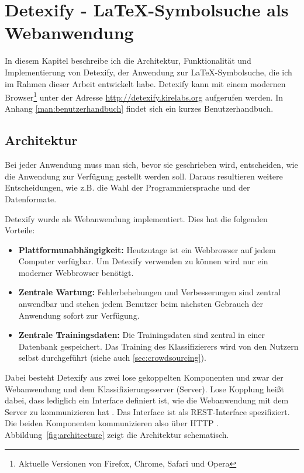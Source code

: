 \chapter[Detexify]{Detexify - \LaTeX-Symbolsuche als Webanwendung} %
\label{cha:detexify}

In diesem Kapitel beschreibe ich die Architektur, Funktionalität und Implementierung von Detexify, der Anwendung zur \LaTeX-Symbolsuche, die ich im Rahmen dieser Arbeit entwickelt habe. Detexify kann mit einem modernen Browser\footnote{Aktuelle Versionen von Firefox, Chrome, Safari und Opera} unter der Adresse \url{http://detexify.kirelabs.org} aufgerufen werden. In Anhang \ref{man:benutzerhandbuch} findet sich ein kurzes Benutzerhandbuch. 

\section{Architektur} %
\label{sec:architektur}

Bei jeder Anwendung muss man sich, bevor sie geschrieben wird, entscheiden, wie die Anwendung zur Verfügung gestellt werden soll. Daraus resultieren weitere Entscheidungen, wie z.B. die Wahl der Programmiersprache und der Datenformate.

Detexify wurde als Webanwendung implementiert. Dies hat die folgenden Vorteile:

\begin{itemize}
  \item \textbf{Plattformunabhängigkeit:} Heutzutage ist ein Webbrowser auf jedem Computer verfügbar. Um Detexify verwenden zu können wird nur ein moderner Webbrowser benötigt.
  \item \textbf{Zentrale Wartung:} Fehlerbehebungen und Verbesserungen sind zentral anwendbar und stehen jedem Benutzer beim nächsten Gebrauch der Anwendung sofort zur Verfügung.
  \item \textbf{Zentrale Trainingsdaten:} Die Trainingsdaten sind zentral in einer Datenbank gespeichert. Das Training des Klassifizierers wird von den Nutzern selbst durchgeführt (siehe auch \ref{sec:crowdsourcing}).
\end{itemize}

Dabei besteht Detexify aus zwei lose gekoppelten Komponenten und zwar der Webanwendung und dem Klassifizierungsserver (Server). Lose Kopplung heißt dabei, dass lediglich ein Interface definiert ist, wie die Webanwendung mit dem Server zu kommunizieren hat \cite{Tilkov:2005p11813}. Das Interface ist als \ac{REST}-Interface \cite{rest} spezifiziert. Die beiden Komponenten kommunizieren also über \ac{HTTP} \cite{http}. Abbildung~\ref{fig:architecture} zeigt die Architektur schematisch.

